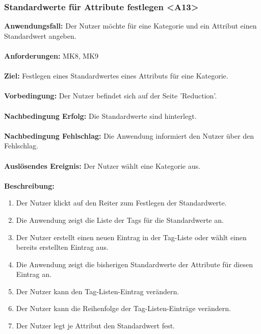 \documentclass[parskip=full]{scrartcl} %
\begin{document}
\subsubsection*{Standardwerte für Attribute festlegen <A13>}
\textbf{Anwendungsfall:} Der Nutzer möchte für eine Kategorie und ein Attribut einen Standardwert angeben.\\\\
\textbf{Anforderungen:} MK8, MK9\\\\
\textbf{Ziel:} Festlegen eines Standardwertes eines Attributs für eine Kategorie. \\\\
\textbf{Vorbedingung:} Der Nutzer befindet sich auf der Seite 'Reduction'. \\\\
\textbf{Nachbedingung Erfolg:} Die Standardwerte sind hinterlegt. \\\\
\textbf{Nachbedingung Fehlschlag:} Die Anwendung informiert den Nutzer über den Fehlschlag. \\\\
\textbf{Auslösendes Ereignis:} Der Nutzer wählt eine Kategorie aus. \\\\
\textbf{Beschreibung:}
\begin{enumerate}
    \item Der Nutzer klickt auf den Reiter zum Festlegen der Standardwerte.
    \item Die Anwendung zeigt die Liste der Tags für die Standardwerte an.
    \item Der Nutzer erstellt einen neuen Eintrag in der Tag-Liste oder wählt einen bereits erstellten Eintrag aus.
    \item Die Anwendung zeigt die bisherigen Standardwerte der Attribute für diesen Eintrag an.
    \item Der Nutzer kann den Tag-Listen-Eintrag verändern.
    \item Der Nutzer kann die Reihenfolge der Tag-Listen-Einträge verändern.
    \item Der Nutzer legt je Attribut den Standardwert fest.
\end{enumerate}
\newpage
\end{document}
